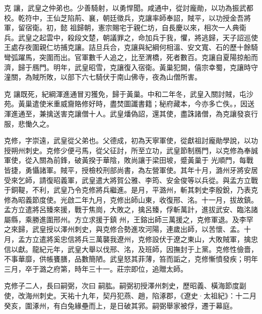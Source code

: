 
\begin{pinyinscope}

 克
 讓，武皇之仲弟也。少善騎射，以勇悍聞。咸通中，從討龐勛，以功為振武都校。乾符中，王仙芝陷荊、襄，朝廷徵兵，克讓率師奉詔，賊平，以功授金吾將軍，留宿衛。初，懿
 祖歸朝，憲宗賜宅于親仁坊，自長慶以來，相次一人典衛兵。武皇之起雲中，殺段文楚，朝議罪之，命加兵于我，懼，將逃歸，天子詔巡使王處存夜圍親仁坊捕克讓。詰旦兵合，克讓與紀綱何相溫、安文寬、石的歷十餘騎彎弧躍馬，突圍而出。官軍數千人追之，比至渭橋，死者數百。克讓自夏陽掠船而濟，歸于鴈門。明年，武皇昭雪，克讓復入宿衛。黃巢犯闕，僖宗幸蜀，克讓時守潼關，為賊所敗，以部下六七騎伏于南山佛寺，夜為山僧所害。



 克
 讓既死，紀綱渾進通冒刃獲免，歸于黃巢。中和二年冬，武皇入關討賊，屯沙苑。黃巢遣使米重威齎賂修好時，盡焚圖讖書籍；秘府藏本，今亦多亡佚。，因送渾進通至，兼擒送害克讓僧十人。武皇燔偽詔，還其使，盡誅諸僧，為克讓發哀行服，悲慟久之。



 克修，字崇遠，武皇從父弟也。父德成，初為天寧軍使，從獻祖討龐勛學說，以功授朔州刺史。克修少便弓馬，從父征討，所至立功，武皇節制鴈門，以克修為奉誠軍使，從入關為前鋒，破黃揆于華陰，敗尚讓于梁田坡，蹙黃巢于
 光順門，每戰皆捷，勇懾諸軍。賊平，授檢校刑部尚書，為左營軍使。其年十月，潞州牙將安居受來乞師，請復昭義軍，武皇遣大將賀公雅、李筠、安金俊等以兵從。與孟方立戰于銅鞮，不利，武皇乃令克修將兵繼進。是月，平潞州，斬其刺史李殷銳，乃表克修為昭義節度使。光啟二年九月，克修出師山東，收復邢、洺。十一月，拔故鎮。孟方立遣將呂臻來援，戰于焦崗，大敗之，擒呂臻，俘斬萬計，進拔武安、臨洺諸屬縣，乘勝進圍邢州。方立求援于鎮
 州，王鎔出師三萬援之，克修軍退。及李罕之來歸，武皇授以澤州刺史，與克修合勢進攻河陽，連歲出師，以苦懷、孟。十月，孟方立遣將奚忠信將兵三萬襲我遼州，克修設伏于遼之東山，大敗賊軍，擒忠信以獻。龍紀元年，武皇大舉以伐邢、洺，及班師，因撫封于上黨。克修性儉嗇，不事華靡，供帳饔膳，品數簡陋。武皇怒其菲薄，笞而詬之，克修慚憤發疾；明年三月，卒于潞之府第，時年三十一。莊宗即位，追贈太師。



 克修子二人，長曰嗣弼，次曰
 嗣肱。嗣弼初授澤州刺史，歷昭義、橫海節度副使，改海州刺史。天祐十九年，契丹犯燕、趙，陷涿郡，《遼史·太祖紀》：十二月癸亥，圍涿州，有白兔緣壘而上，是日破其郛。嗣弼舉家被俘，遷于幕庭。




\end{pinyinscope}
